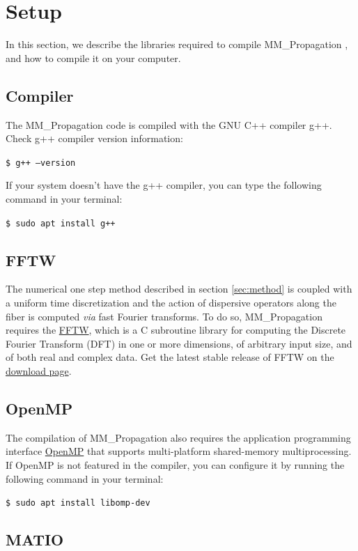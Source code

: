 \documentclass[11pt]{amsart}
\newcommand{\name}{{\rm MM\_Propagation }}
\begin{document}
\section{Setup}
\label{sec:setup}

In this section, we describe the libraries required to compile \name,
and how to compile it on your computer.

\subsection{Compiler}

The \name code is compiled with the GNU C++ compiler g++. 
Check g++ compiler version information:     

{\tt \$ g++ --version}

If your system doesn’t have the g++ compiler, you can type the following command in your terminal:

{\tt \$ sudo apt install g++}

\subsection{FFTW}

The numerical one step method described in section \ref{sec:method}
is coupled with a uniform time discretization and the action of dispersive operators
along the fiber is computed {\it via} fast Fourier transforms.
To do so, \name
requires the \href{http://www.fftw.org/fftw2\_doc/fftw\_6.html}{FFTW},
which is a C subroutine library for computing the Discrete Fourier Transform (DFT)
in one or more dimensions, of arbitrary input size, and of both real and complex data. Get the latest stable release of FFTW on the \href{http://www.fftw.org/download.html}{download page}.

\subsection{OpenMP}

The compilation of \name
also requires the application programming interface \href{https://www.openmp.org/}{OpenMP}
that supports multi-platform shared-memory multiprocessing. If OpenMP is not featured in the compiler, you can configure it by running the following command in your terminal:

{\tt \$ sudo apt install libomp-dev}

\subsection{MATIO}
\end{document}
